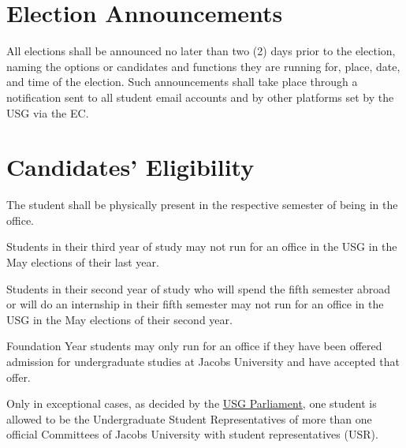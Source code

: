 \section{Election Announcements} 
All elections shall be announced no later than two (2) days prior to the election, naming the options or candidates and functions they are running for, place, date, and time of the election. Such announcements shall take place through a notification sent to all student email accounts and by other platforms set by the USG via the EC.

\section{Candidates' Eligibility}
The student shall be physically present in the respective semester of being in the office.
\begin{parenum}
\item {}
\item
Students in their third year of study may not run for an office in the USG in the May elections of their last year.

\item
Students in their second year of study who will spend the fifth semester abroad or will do an internship in their fifth semester may not run for an office in the USG in the May elections of their second year.

\item
Foundation Year students may only run for an office if they have been offered admission for undergraduate studies at Jacobs University and have accepted that offer.

\item 
Only in exceptional cases, as decided by the \hyperref[USGParliamentDef]{USG Parliament}, one student is allowed to be the Undergraduate Student Representatives of more than one official Committees of Jacobs University with student representatives (USR).

\end{parenum}

